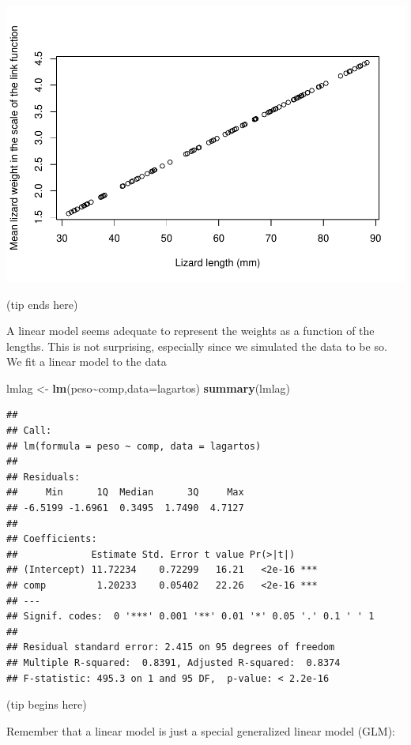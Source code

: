 \documentclass[
]{book}
\newenvironment{Shaded}{\begin{snugshade}}{\end{snugshade}}
\newcommand{\AttributeTok}[1]{\textcolor[rgb]{0.13,0.29,0.53}{#1}}
\newcommand{\FunctionTok}[1]{\textcolor[rgb]{0.13,0.29,0.53}{\textbf{#1}}}
\newcommand{\NormalTok}[1]{#1}
\newcommand{\OtherTok}[1]{\textcolor[rgb]{0.56,0.35,0.01}{#1}}
\newcommand{\SpecialCharTok}[1]{\textcolor[rgb]{0.81,0.36,0.00}{\textbf{#1}}}
\begin{document}
\includegraphics{ECOMODbook_files/figure-latex/unnamed-chunk-2-1.pdf}

(tip ends here)

A linear model seems adequate to represent the weights as a function of the lengths. This is not surprising, especially since we simulated the data to be so. We fit a linear model to the data

\begin{Shaded}
\begin{Highlighting}[]
\NormalTok{lmlag }\OtherTok{\textless{}{-}} \FunctionTok{lm}\NormalTok{(peso}\SpecialCharTok{\textasciitilde{}}\NormalTok{comp,}\AttributeTok{data=}\NormalTok{lagartos)}
\FunctionTok{summary}\NormalTok{(lmlag)}
\end{Highlighting}
\end{Shaded}

\begin{verbatim}
## 
## Call:
## lm(formula = peso ~ comp, data = lagartos)
## 
## Residuals:
##     Min      1Q  Median      3Q     Max 
## -6.5199 -1.6961  0.3495  1.7490  4.7127 
## 
## Coefficients:
##             Estimate Std. Error t value Pr(>|t|)    
## (Intercept) 11.72234    0.72299   16.21   <2e-16 ***
## comp         1.20233    0.05402   22.26   <2e-16 ***
## ---
## Signif. codes:  0 '***' 0.001 '**' 0.01 '*' 0.05 '.' 0.1 ' ' 1
## 
## Residual standard error: 2.415 on 95 degrees of freedom
## Multiple R-squared:  0.8391, Adjusted R-squared:  0.8374 
## F-statistic: 495.3 on 1 and 95 DF,  p-value: < 2.2e-16
\end{verbatim}

(tip begins here)

Remember that a linear model is just a special generalized linear model (GLM):
\end{document}
